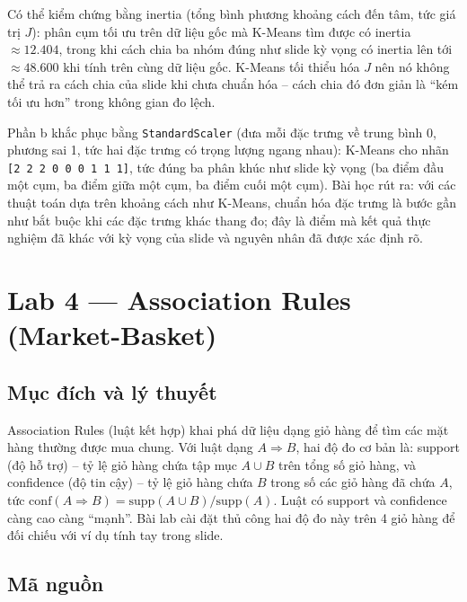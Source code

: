 \documentclass[12pt,a4paper,oneside]{article}
\begin{document}
Có thể kiểm chứng bằng inertia (tổng bình phương khoảng cách đến tâm, tức giá trị $J$): phân cụm tối ưu trên dữ liệu gốc mà K-Means tìm được có inertia $\approx 12.404$, trong khi cách chia ba nhóm đúng như slide kỳ vọng có inertia lên tới $\approx 48.600$ khi tính trên cùng dữ liệu gốc. K-Means tối thiểu hóa $J$ nên nó không thể trả ra cách chia của slide khi chưa chuẩn hóa -- cách chia đó đơn giản là ``kém tối ưu hơn'' trong không gian đo lệch.

Phần b khắc phục bằng \texttt{StandardScaler} (đưa mỗi đặc trưng về trung bình 0, phương sai 1, tức hai đặc trưng có trọng lượng ngang nhau): K-Means cho nhãn \texttt{[2 2 2 0 0 0 1 1 1]}, tức đúng ba phân khúc như slide kỳ vọng (ba điểm đầu một cụm, ba điểm giữa một cụm, ba điểm cuối một cụm). Bài học rút ra: với các thuật toán dựa trên khoảng cách như K-Means, chuẩn hóa đặc trưng là bước gần như bắt buộc khi các đặc trưng khác thang đo; đây là điểm mà kết quả thực nghiệm đã khác với kỳ vọng của slide và nguyên nhân đã được xác định rõ.

\section{Lab 4 --- Association Rules (Market-Basket)}

\subsection{Mục đích và lý thuyết}

Association Rules (luật kết hợp) khai phá dữ liệu dạng giỏ hàng để tìm các mặt hàng thường được mua chung. Với luật dạng $A \Rightarrow B$, hai độ đo cơ bản là: support (độ hỗ trợ) -- tỷ lệ giỏ hàng chứa tập mục $A \cup B$ trên tổng số giỏ hàng, và confidence (độ tin cậy) -- tỷ lệ giỏ hàng chứa $B$ trong số các giỏ hàng đã chứa $A$, tức $\mathrm{conf}(A \Rightarrow B) = \mathrm{supp}(A \cup B) / \mathrm{supp}(A)$. Luật có support và confidence càng cao càng ``mạnh''. Bài lab cài đặt thủ công hai độ đo này trên 4 giỏ hàng để đối chiếu với ví dụ tính tay trong slide.

\subsection{Mã nguồn}


\end{document}
